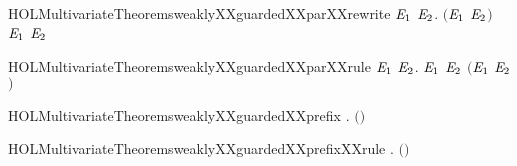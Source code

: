 \newcommand{\HOLMultivariateTheoremsweaklyXXguardedXXpar}{\UseVerbatim{HOLMultivariateTheoremsweaklyXXguardedXXpar}}
\begin{SaveVerbatim}{HOLMultivariateTheoremsweaklyXXguardedXXparXXrewrite}
\HOLTokenTurnstile{} \HOLSymConst{\HOLTokenForall{}} \ensuremath{\HOLBoundVar{E}\sb{\mathrm{1}}} \ensuremath{\HOLBoundVar{E}\sb{\mathrm{2}}}.
         \ensuremath{(}\ensuremath{\HOLBoundVar{E}\sb{\mathrm{1}}} \HOLSymConst{\ensuremath{\mid}} \ensuremath{\HOLBoundVar{E}\sb{\mathrm{2}}}\ensuremath{)} \HOLSymConst{\HOLTokenEquiv{}}
         \ensuremath{\HOLBoundVar{E}\sb{\mathrm{1}}} \HOLSymConst{\HOLTokenConj{}}   \ensuremath{\HOLBoundVar{E}\sb{\mathrm{2}}}
\end{SaveVerbatim}
\newcommand{\HOLMultivariateTheoremsweaklyXXguardedXXparXXrewrite}{\UseVerbatim{HOLMultivariateTheoremsweaklyXXguardedXXparXXrewrite}}
\begin{SaveVerbatim}{HOLMultivariateTheoremsweaklyXXguardedXXparXXrule}
\HOLTokenTurnstile{} \HOLSymConst{\HOLTokenForall{}} \ensuremath{\HOLBoundVar{E}\sb{\mathrm{1}}} \ensuremath{\HOLBoundVar{E}\sb{\mathrm{2}}}.
         \ensuremath{\HOLBoundVar{E}\sb{\mathrm{1}}} \HOLSymConst{\HOLTokenConj{}}   \ensuremath{\HOLBoundVar{E}\sb{\mathrm{2}}} \HOLSymConst{\HOLTokenImp{}}
         \ensuremath{(}\ensuremath{\HOLBoundVar{E}\sb{\mathrm{1}}} \HOLSymConst{\ensuremath{\mid}} \ensuremath{\HOLBoundVar{E}\sb{\mathrm{2}}}\ensuremath{)}
\end{SaveVerbatim}
\newcommand{\HOLMultivariateTheoremsweaklyXXguardedXXparXXrule}{\UseVerbatim{HOLMultivariateTheoremsweaklyXXguardedXXparXXrule}}
\begin{SaveVerbatim}{HOLMultivariateTheoremsweaklyXXguardedXXprefix}
\HOLTokenTurnstile{} \HOLSymConst{\HOLTokenForall{}}  .   \ensuremath{(}\HOLSymConst{\ensuremath{\ldotp}}\ensuremath{)} \HOLSymConst{\HOLTokenImp{}}   
\end{SaveVerbatim}
\newcommand{\HOLMultivariateTheoremsweaklyXXguardedXXprefix}{\UseVerbatim{HOLMultivariateTheoremsweaklyXXguardedXXprefix}}
\begin{SaveVerbatim}{HOLMultivariateTheoremsweaklyXXguardedXXprefixXXrule}
\HOLTokenTurnstile{} \HOLSymConst{\HOLTokenForall{}}  .    \HOLSymConst{\HOLTokenImp{}}   \ensuremath{(}\HOLSymConst{\ensuremath{\ldotp}}\ensuremath{)}
\end{SaveVerbatim}
